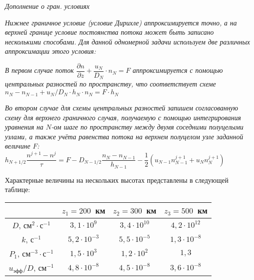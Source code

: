 \textit{ Дополнение о гран. условиях}

\textit{ Нижнее граничное условие (условие Дирихле) аппроксимируется точно, а на верхней границе условие постоянства потока может быть записано несколькими способами. Для данной одномерной задачи используем две различных аппроксимации этого условия:}


\textit{В первом случае поток $\dfrac{\partial n}{\partial z}+\dfrac{u_N}{D_N}\cdot n_N=F$ аппроксимируется с помощью центральных разностей по пространству, что соответствует схеме $n_N-n_{N-1}+u_N/D_N\cdot h_N\cdot n_N = F\cdot h_N$}

\textit{Во втором случае для схемы центральных разностей запишем согласованную схему для верхнего граничного случая, получаемую с помощью интегрирования уравнения на $N$-ом шаге по пространству между двумя соседними полуцелыми узлами, а также учёта равенства потока на верхнем полуцелом узле заданной величине $F$: $h_{N+1/2}\dfrac{n^{j+1}-n^j}{\tau}= F - D_{N-1/2}\dfrac{n_N-n_{N-1}}{h_{N-1}}-\dfrac{1}{2}(u_{N-1}n_{N-1}^{j+1}+u_{N}n_{N}^{j+1})$
}
 
 Характерные величины на нескольких высотах представлены в следующей таблице: 

\smallskip

\begin{tabular}{|c|c|c|c|}
\hline
&$z_1=200$~км&$z_2=300$~км&$z_3=500$~км\\
\hline
$D$, см$^{2}\cdot$с$^{-1}$&$3{,}1\cdot 10^9$&$3{,}4\cdot 10^{10}$&$4{,}2\cdot 10^{12}$\\
\hline
$k$, с$^{-1}$&$5{,}2\cdot 10^{-3}$&$5{,}5\cdot 10^{-5}$&$1{,}3\cdot 10^{-8}$\\
\hline
$P_1$, см$^{-3}\cdot$с$^{-1}$&$1{,}5\cdot 10^3$&$1{,}2\cdot 10^{2}$&$1{,}3$\\
\hline
$u_\textrm{эфф}/D$, см$^{-1}$&$4{,}8\cdot 10^{-8}$&$4{,}5\cdot 10^{-8}$&$3{,}6\cdot 10^{-8}$\\
\hline
\end{tabular}

\medskip

